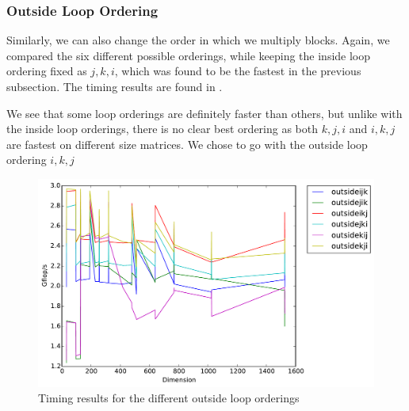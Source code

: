 \subsubsection{Outside Loop Ordering}
Similarly, we can also change the order in which we multiply blocks. Again, we
compared the six different possible orderings, while keeping the inside loop
ordering fixed as $j,k,i$, which was found to be the fastest in the previous
subsection. The timing results are found in .

We see that some loop orderings are definitely faster than others, but unlike
with the inside loop orderings, there is no clear best ordering as both $k,j,i$
and $i,k,j$ are fastest on different size matrices. We chose to go with the
outside loop ordering $i,k,j$

\begin{figure}[hh]
  \centering
  \includegraphics[width=\textwidth]{img/timing_outsideloops.pdf}
  \caption{Timing results for the different outside loop orderings}
  \label{fig:outsideloop}
\end{figure}
